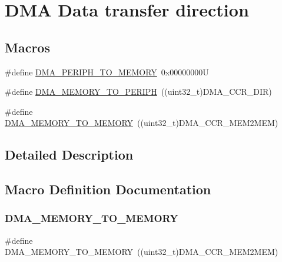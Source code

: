 \hypertarget{group___d_m_a___data__transfer__direction}{}\section{D\+MA Data transfer direction}
\label{group___d_m_a___data__transfer__direction}
\subsection*{Macros}
\begin{DoxyCompactItemize}
\item 
\#define \hyperlink{group___d_m_a___data__transfer__direction_gacb2cbf03ecae6804ae4a6f60a3e37c12}{D\+M\+A\+\_\+\+P\+E\+R\+I\+P\+H\+\_\+\+T\+O\+\_\+\+M\+E\+M\+O\+RY}~0x00000000U
\item 
\#define \hyperlink{group___d_m_a___data__transfer__direction_ga9e76fc559a2d5c766c969e6e921b1ee9}{D\+M\+A\+\_\+\+M\+E\+M\+O\+R\+Y\+\_\+\+T\+O\+\_\+\+P\+E\+R\+I\+PH}~((uint32\+\_\+t)D\+M\+A\+\_\+\+C\+C\+R\+\_\+\+D\+IR)
\item 
\#define \hyperlink{group___d_m_a___data__transfer__direction_ga0695035d725855ccf64d2d8452a33810}{D\+M\+A\+\_\+\+M\+E\+M\+O\+R\+Y\+\_\+\+T\+O\+\_\+\+M\+E\+M\+O\+RY}~((uint32\+\_\+t)D\+M\+A\+\_\+\+C\+C\+R\+\_\+\+M\+E\+M2\+M\+EM)
\end{DoxyCompactItemize}


\subsection{Detailed Description}


\subsection{Macro Definition Documentation}
\mbox{\label{group___d_m_a___data__transfer__direction_ga0695035d725855ccf64d2d8452a33810}} 
\subsubsection{\texorpdfstring{D\+M\+A\+\_\+\+M\+E\+M\+O\+R\+Y\+\_\+\+T\+O\+\_\+\+M\+E\+M\+O\+RY}{DMA\_MEMORY\_TO\_MEMORY}}
{\footnotesize\ttfamily \#define D\+M\+A\+\_\+\+M\+E\+M\+O\+R\+Y\+\_\+\+T\+O\+\_\+\+M\+E\+M\+O\+RY~((uint32\+\_\+t)D\+M\+A\+\_\+\+C\+C\+R\+\_\+\+M\+E\+M2\+M\+EM)}

